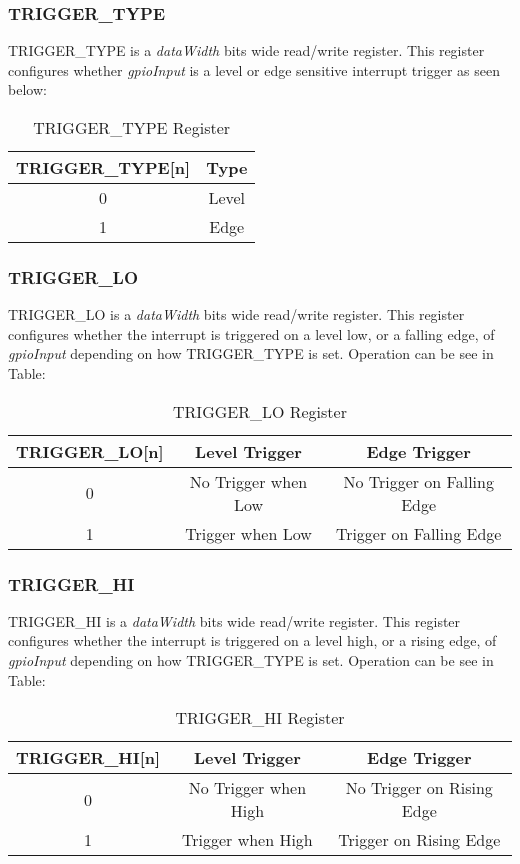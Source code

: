 \subsubsection{TRIGGER\_TYPE}
TRIGGER\_TYPE is a \textit{dataWidth} bits wide read/write register. This register configures whether \textit{gpioInput} is a level or edge sensitive
interrupt trigger as seen below:
\begin{table}[h]
  \centering
  \begin{tabular}{|c|c|}
      \hline
      \textbf{TRIGGER\_TYPE[n]} & \textbf{Type} \\ \hline
      0 & Level \\ \hline
      1 & Edge \\ \hline
  \end{tabular}
  \caption{TRIGGER\_TYPE Register}
\end{table}

\subsubsection{TRIGGER\_LO}
TRIGGER\_LO is a \textit{dataWidth} bits wide read/write register. This register configures whether the interrupt is triggered on a level low, or a falling edge, 
of \textit{gpioInput} depending on how TRIGGER\_TYPE is set. Operation can be see in Table:
\begin{table}[h]
  \centering
  \begin{tabular}{|c|c|c|}
      \hline
      \textbf{TRIGGER\_LO[n]} & \textbf{Level Trigger} & \textbf{Edge Trigger} \\ \hline
      0 & No Trigger when Low & No Trigger on Falling Edge\\ \hline
      1 & Trigger when Low & Trigger on Falling Edge\\ \hline
  \end{tabular}
  \caption{TRIGGER\_LO Register}
\end{table}

\subsubsection{TRIGGER\_HI}
TRIGGER\_HI is a \textit{dataWidth} bits wide read/write register. This register configures whether the interrupt is triggered on a level high, or a rising edge, 
of \textit{gpioInput} depending on how TRIGGER\_TYPE is set. Operation can be see in Table:
\begin{table}[h]
  \centering
  \begin{tabular}{|c|c|c|}
      \hline
      \textbf{TRIGGER\_HI[n]} & \textbf{Level Trigger} & \textbf{Edge Trigger} \\ \hline
      0 & No Trigger when High & No Trigger on Rising Edge\\ \hline
      1 & Trigger when High & Trigger on Rising Edge\\ \hline
  \end{tabular}
  \caption{TRIGGER\_HI Register}
\end{table}

